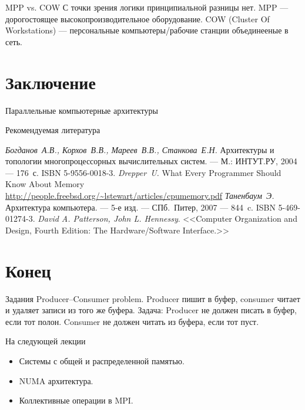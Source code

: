 \begin{frame}{MPP vs. COW}
\vfill
С точки зрения логики принципиальной разницы нет.
\vfill
MPP --- дорогостоящее высокопроизводительное оборудование.
\vfill
COW (Cluster Of Workstations) --- персональные компьютеры/рабочие станции
объединееные в сеть.
\end{frame}

\section{Заключение}

\begin{frame}{Параллельные компьютерные архитектуры}
\centering
{}
\end{frame}

\begin{frame}[allowframebreaks]{Рекомендуемая литература}
\begin{thebibliography}{99}
    \bibitem{} \textit{Богданов~А.В., Корхов~В.В., Мареев~В.В., Станкова~Е.Н.}
    Архитектуры и топологии многопроцессорных вычислительных систем. --- М.:
    ИНТУТ.РУ, 2004 --- 176~с. ISBN 5-9556-0018-3.
    \bibitem{} \textit{Drepper~U.} What Every Programmer Should Know About Memory
    \url{http://people.freebsd.org/~lstewart/articles/cpumemory.pdf}
    \bibitem{} \textit{Таненбаум~Э.} Архитектура компьютера. --- 5-е изд. --- СПб.~Питер, 2007 --- 844~c. ISBN 5-469-01274-3.
     \textit{David A. Patterson, John L. Hennessy}. <<Computer Organization and Design, Fourth Edition: The Hardware/Software Interface.>>
\end{thebibliography}
\end{frame}

\section*{Конец}

\ifsbertech
\begin{frame}{Задания}
Producer--Consumer problem.
\vfill
Producer пишит в буфер, consumer читает и удаляет записи из того же буфера.
\vfill
Задача: Producer не должен писать в буфер, если тот полон. Consumer не должен
читать из буфера, если тот пуст.
\end{frame}
\fi

\begin{frame}{На следующей лекции}
\begin{itemize}
\ifsbertech
    \item Системы с общей и распределенной памятью.
    \item NUMA архитектура.
\fi
\ifmipt
    \item Коллективные операции в MPI.
\fi
\end{itemize}
\end{frame}

